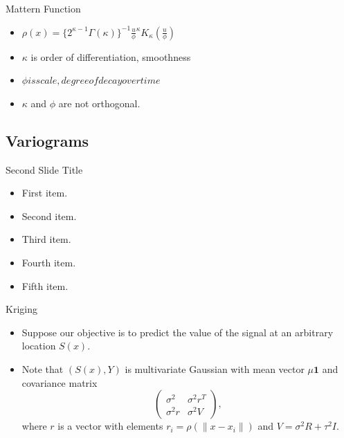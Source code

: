 \documentclass{beamer}
\begin{document}
\begin{frame}{Mattern Function}{}
  \begin{itemize}
  \item { 
  		$\rho(x) =\{2^{\kappa-1} \Gamma(\kappa)\}^{-1} \frac{u}{\phi}^\kappa K_\kappa (\frac{u}{\phi})$
  }
  \item {
    $\kappa$ is order of differentiation, smoothness
  }
  \item{
  	$\phi is scale, degree of decay over time$
  }
  \item{
  	$\kappa$ and $\phi$ are not orthogonal.
  }
  \end{itemize}
\end{frame}

\subsection{Variograms}

\begin{frame}{Second Slide Title}
  \begin{itemize}
  \item {
    First item.
    \pause %
  }
  \item {   
    Second item.
  }
  \item<3-> {
    Third item.
  }
  \item<4-> {
    Fourth item.
  }
  \item<5-> {
    Fifth item. 
  }
  \end{itemize}
\end{frame}


\begin{frame}{Kriging}
	\begin{itemize}
		
		\item Suppose our objective is to predict the value of the signal at an arbitrary location $S(x)$.
		
		\item Note that $(S(x), Y)$ is multivariate Gaussian with mean vector $\mu \mathbf{1}$ and covariance matrix
		$$
		\begin{pmatrix}
		\sigma^2 & \sigma^2 r^T\\
		\sigma^2 r & \sigma^2 V
		\end{pmatrix},
		$$
		where $r$ is a vector with elements $r_i = \rho(\|x-x_i\|)$ and $V = \sigma^2 R + \tau^2 I$.
		
		
	\end{itemize}
\end{frame}
\end{document}
